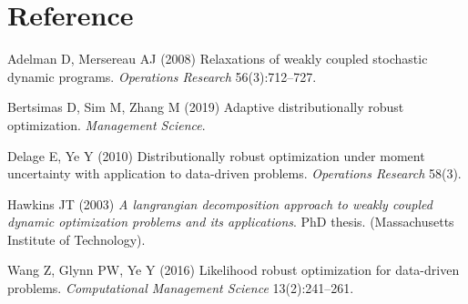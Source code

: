 \documentclass[
  a4paper,
,tablecaptionabove
]{scrartcl}
\numberwithin{equation}{section}
\newlength{\cslhangindent}
\newenvironment{cslreferences}%
  {\setlength{\parindent}{0pt}%
  \everypar{\setlength{\hangindent}{\cslhangindent}}\ignorespaces}%
  {\par}
\begin{document}
\hypertarget{reference}{%
\section*{Reference}\label{reference}}

\hypertarget{refs}{}
\begin{cslreferences}
\leavevmode\hypertarget{ref-adelman_relaxations_2008}{}%
Adelman D, Mersereau AJ (2008) Relaxations of weakly coupled stochastic
dynamic programs. \emph{Operations Research} 56(3):712--727.

\leavevmode\hypertarget{ref-bertsimas_adaptive_2019}{}%
Bertsimas D, Sim M, Zhang M (2019) Adaptive distributionally robust
optimization. \emph{Management Science}.

\leavevmode\hypertarget{ref-delage_distributionally_2010}{}%
Delage E, Ye Y (2010) Distributionally robust optimization under moment
uncertainty with application to data-driven problems. \emph{Operations
Research} 58(3).

\leavevmode\hypertarget{ref-hawkins_langrangian_2003}{}%
Hawkins JT (2003) \emph{A langrangian decomposition approach to weakly
coupled dynamic optimization problems and its applications}. PhD thesis.
(Massachusetts Institute of Technology).

\leavevmode\hypertarget{ref-wang_likelihood_2016}{}%
Wang Z, Glynn PW, Ye Y (2016) Likelihood robust optimization for
data-driven problems. \emph{Computational Management Science}
13(2):241--261.
\end{cslreferences}
\end{document}

